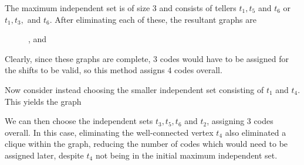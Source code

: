 \documentclass[11pt]{article}
\begin{document}
 The maximum independent set is of size $3$ and consists of tellers $t_1, t_5$ and $t_6$ or $t_1, t_3, $ and $t_6$. After eliminating each of these, the resultant graphs are 
 \begin{figure}[H]
    \centering
    , and
 \end{figure}
 Clearly, since these graphs are complete, $3$ codes would have to be assigned for the shifts to be valid, so this method assigns $4$ codes overall.

 Now consider instead choosing the smaller independent set consisting of $t_1$ and $t_4$. This yields the graph
 \begin{figure}[H]
    \centering
 \end{figure}
 We can then choose the independent sets $t_3, t_5, t_6$ and $t_2$, assigning $3$ codes overall. In this case, eliminating the well-connected vertex $t_4$ also eliminated a clique within the graph, reducing the number of codes which would need to be assigned later, despite $t_4$ not being in the initial maximum independent set.
\end{document}
